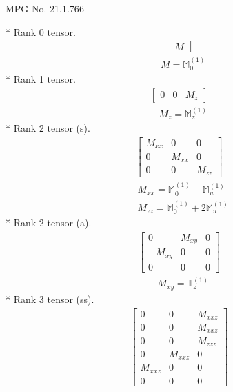 \documentclass[fleqn,8pt,landscape]{jsarticle}
\begin{document}
\setcounter{MaxMatrixCols}{32}

\renewcommand{\tablename}{Table~}
\renewcommand{\figurename}{Figure~}
\begin{center}
\LARGE
MPG No. 21.1.76\quad$6$
\end{center}
* Rank 0 tensor.
\begin{align*}
\begin{bmatrix} M \end{bmatrix}
\end{align*}
\begin{align*}
& M = \mathbb{M}_{0}^{(1)}
\end{align*}
* Rank 1 tensor.
\begin{align*}
\begin{bmatrix} 0 & 0 & M_{z} \end{bmatrix}
\end{align*}
\begin{align*}
& M_{z} = \mathbb{M}_{z}^{(1)}
\end{align*}
* Rank 2 tensor (s).
\begin{align*}
\begin{bmatrix} M_{xx} & 0 & 0 \\ 0 & M_{xx} & 0 \\ 0 & 0 & M_{zz} \end{bmatrix}
\end{align*}
\begin{align*}
& M_{xx} = \mathbb{M}_{0}^{(1)} - \mathbb{M}_{u}^{(1)} \\
& M_{zz} = \mathbb{M}_{0}^{(1)} + 2 \mathbb{M}_{u}^{(1)}
\end{align*}
* Rank 2 tensor (a).
\begin{align*}
\begin{bmatrix} 0 & M_{xy} & 0 \\ - M_{xy} & 0 & 0 \\ 0 & 0 & 0 \end{bmatrix}
\end{align*}
\begin{align*}
& M_{xy} = \mathbb{T}_{z}^{(1)}
\end{align*}
* Rank 3 tensor (ss).
\begin{align*}
\begin{bmatrix} 0 & 0 & M_{xxz} \\ 0 & 0 & M_{xxz} \\ 0 & 0 & M_{zzz} \\ 0 & M_{xxz} & 0 \\ M_{xxz} & 0 & 0 \\ 0 & 0 & 0 \end{bmatrix}
\end{align*}
\end{document}
